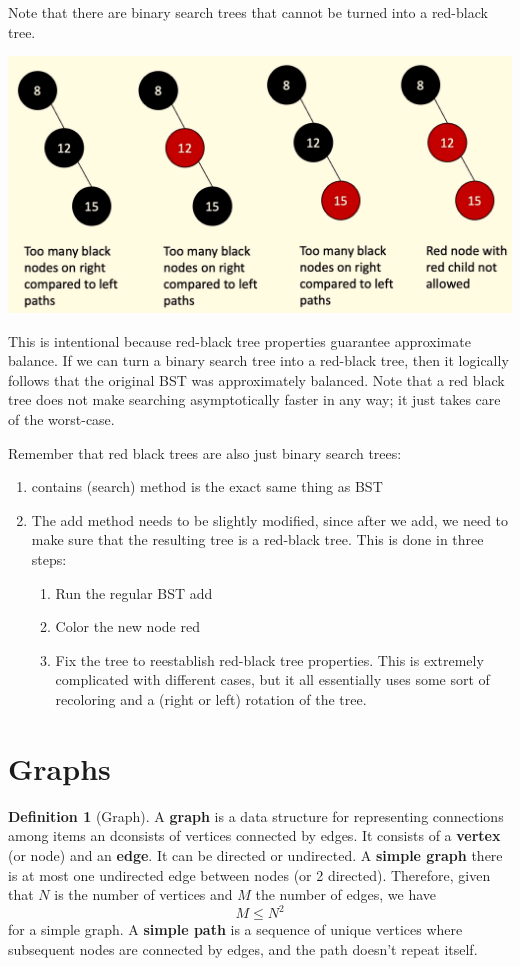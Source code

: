 \documentclass{article}
\theoremstyle{definition}
\theoremstyle{remark}
\theoremstyle{definition}
\newtheorem{definition}{Definition}[section]
\begin{document}
Note that there are binary search trees that cannot be turned into a red-black tree. 
\begin{center}
    \includegraphics[scale=0.3]{img/impossible_red_black.png}
\end{center}
This is intentional because red-black tree properties guarantee approximate balance. If we can turn a binary search tree into a red-black tree, then it logically follows that the original BST was approximately balanced. Note that a red black tree does not make searching asymptotically faster in any way; it just takes care of the worst-case. 

Remember that red black trees are also just binary search trees: 
\begin{enumerate}
    \item contains (search) method is the exact same thing as BST 
    \item The add method needs to be slightly modified, since after we add, we need to make sure that the resulting tree is a red-black tree. This is done in three steps: 
    \begin{enumerate}
        \item Run the regular BST add 
        \item Color the new node red 
        \item Fix the tree to reestablish red-black tree properties. This is extremely complicated with different cases, but it all essentially uses some sort of recoloring and a (right or left) rotation of the tree. 
    \end{enumerate}
\end{enumerate}


\section{Graphs}

\begin{definition}[Graph]
A \textbf{graph} is a data structure for representing connections among items an dconsists of vertices connected by edges. It consists of a \textbf{vertex} (or node) and an \textbf{edge}. It can be directed or undirected. A \textbf{simple graph} there is at most one undirected edge between nodes (or 2 directed). Therefore, given that $N$ is the number of vertices and $M$ the number of edges, we have 
\[M \leq N^2\]
for a simple graph. A \textbf{simple path} is a sequence of unique vertices where subsequent nodes are connected by edges, and the path doesn't repeat itself. 
\end{definition}
\end{document}
